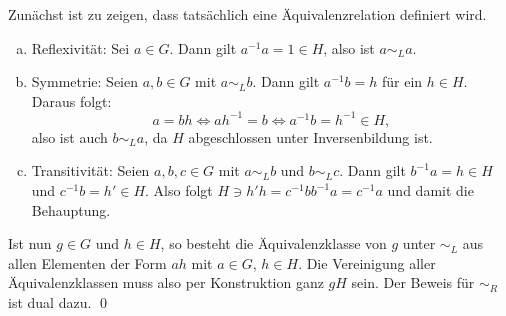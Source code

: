 \begin{lösung}
Zunächst ist zu zeigen, dass tatsächlich eine Äquivalenzrelation definiert wird.\\
\begin{enumerate}[(a)]
\item Reflexivität: Sei $a \in G$. Dann gilt $a^{-1}a = 1 \in H$, also ist $a \sim_L a$.
\item Symmetrie: Seien $a,b \in G$ mit $a \sim_L b$. Dann gilt $a^{-1} b = h$ für ein $h \in H$. Daraus folgt:
\begin{equation}
a = bh \iff ah^{-1} =b \iff a^{-1}b = h^{-1} \in H,
\end{equation}
also ist auch $b \sim_L a$, da $H$ abgeschlossen unter Inversenbildung ist.
\item Transitivität: Seien $a,b,c \in G$ mit $a \sim_L b$ und $b \sim_L c$. Dann gilt $b^{-1}a = h \in H$ und $c^{-1} b = h' \in H$. Also folgt $H \ni h'h = c^{-1}bb^{-1}a = c^{-1} a$ und damit die Behauptung.
\end{enumerate}
Ist nun $g \in G$ und $h \in H$, so besteht die Äquivalenzklasse von $g$ unter $\sim_L$ aus allen Elementen der Form $ah$ mit $a \in G$, $h \in H$. Die Vereinigung aller Äquivalenzklassen muss also per Konstruktion ganz $gH$ sein. Der Beweis für $\sim_R$ ist dual dazu. \qed
\end{lösung}

